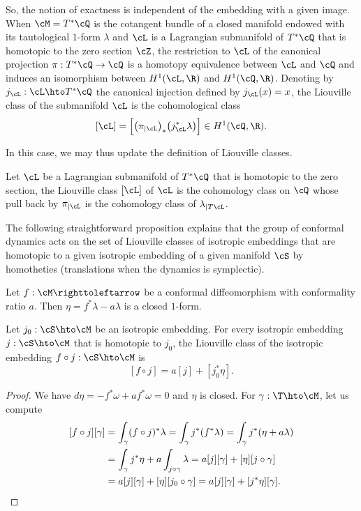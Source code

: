 So, the notion of exactness is independent of the embedding with a given image. When $\cM=T^*\cQ$ is the cotangent bundle of a closed manifold endowed with its tautological $1$-form $\lambda$ and $\cL$ is a Lagrangian submanifold of $T^*\cQ$ that is homotopic to the zero section $\cZ$, the restriction to $\cL$ of the canonical projection $\pi:T^*\cQ\to \cQ$ is a homotopy equivalence between $\cL$ and $\cQ$ and induces an isomorphism between $H^1(\cL,\R)$ and $H^1(\cQ,\R)$. Denoting by $j_\cL:\cL\hto T^*\cQ$ the canonical injection defined by $j_\cL(x)=x$, the Liouville class of the submanifold $\cL$ is the cohomological class
\[
[\cL]=\Big[\big(\pi_{|\cL}\big)_*\big(j_\cL^*\lambda\big)\Big]\in H^1(\cQ,\R).
\]

In this case, we may thus update the definition of Liouville classes.

\begin{definition}
Let $\cL$ be a Lagrangian submanifold of $T^*\cQ$ that is homotopic to the zero section, the Liouville class $[\cL]$ of $\cL$ is the cohomology class on $\cQ$ whose pull back by $\pi_{|\cL}$ is the cohomology class of $\lambda_{|T\cL}$.
\end{definition}

The following straightforward proposition explains that the group of conformal dynamics acts {on the set of} Liouville classes of isotropic embeddings { that are homotopic to a given isotropic embedding } of a given manifold $\cS$ by homotheties (translations when the dynamics is symplectic).

\begin{proposition}\label{Phomothety}
Let $f: \cM \righttoleftarrow$ be a conformal diffeomorphism with conformality ratio $a$. Then $\eta=f^*\lambda-a\lambda$ is a closed $1$-form.

Let $ j_0:\cS\hto\cM$ be an isotropic embedding. For every isotropic embedding $ j:\cS\hto\cM$ that is homotopic to $j_0$, the Liouville class of the isotropic embedding $f\circ j:\cS\hto\cM$ is
\[
[f\circ j]=a[j]+[j_0^*\eta].
\]
\end{proposition}

\begin{proof}
We have $d\eta=-f^*\omega+af^*\omega=0$ and $\eta$ is closed. 
For $\gamma:\T\hto\cM$, let us compute
\[
\begin{split}
[f\circ j][\gamma]&=\int_\gamma(f\circ j)^*\lambda=\int_\gamma j^*(f^*\lambda)=\int_\gamma j^*(\eta +a\lambda)\\
&=\int_\gamma j^*\eta+a\int_{j\circ\gamma} \lambda=a[j][\gamma]+ [\eta][j\circ\gamma]\\
&=a[j][\gamma]+ [\eta][j_0\circ\gamma]=a[j][\gamma]+ [j^*\eta][\gamma].\qedhere
\end{split}
\]
\end{proof}

